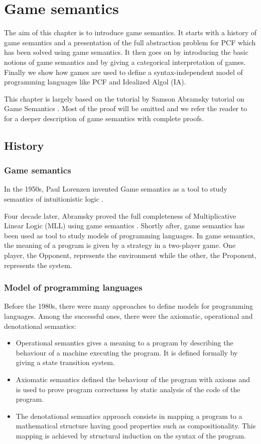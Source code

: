 \chapter{Game semantics}

The aim of this chapter is to introduce game semantics. It starts
with a history of game semantics and a presentation of the full
abstraction problem for PCF which has been solved using game
semantics. It then goes on by introducing the basic notions of game
semantics and by giving a categorical interpretation of games.
Finally we show how games are used to define a syntax-independent
model of programming languages like PCF and Idealized Algol (IA).

This chapter is largely based on the tutorial by Samson Abramsky tutorial on Game Semantics \cite{AM98a}.
Most of the proof will be omitted and we refer the reader to
\cite{hylandong_pcf, abramsky94full} for a deeper description
of game semantics with complete proofs.

\section{History}

\subsection{Game semantics}

In the 1950s, Paul Lorenzen invented Game semantics as a tool to
study semantics of intuitionistic logic \citep{lor61}.

Four decade later, Abramsky proved the full completeness of
Multiplicative Linear Logic (MLL) using game semantics
\citep{abramsky92games}. Shortly after, game semantics has been used
as tool to study models of programming languages. In game semantics,
the meaning of a program is given by a strategy in a two-player
game. One player, the Opponent, represents the environment while the
other, the Proponent, represents the system.


\subsection{Model of programming languages}

Before the 1980s, there were many approaches to define models for
programming languages. Among the successful ones, there were the
axiomatic, operational and denotational semantics:
\begin{itemize}
\item Operational semantics gives a meaning to a program by describing the
behaviour of a machine executing the program. It is defined formally
by giving a state transition system.
\item Axiomatic semantics defined the behaviour of the program
with axioms and is used to prove program correctness by static
analysis of the code of the program.
\item The denotational semantics approach consists in mapping a program to a mathematical structure
having good properties such as compositionality. This mapping is
achieved by structural induction on the syntax of the program.
\end{itemize}

